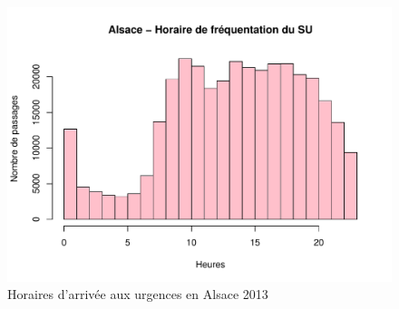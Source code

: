 \documentclass[12pt,english,french,twoside]{book}\usepackage[]{graphicx}\usepackage[]{color}
\makeatletter
\def\maxwidth{ %
  \ifdim\Gin@nat@width>\linewidth
    \linewidth
  \else
    \Gin@nat@width
  \fi
}
\newenvironment{knitrout}{}{} %
\makeatother
\begin{document}
\begin{figure}
\begin{center}
\begin{knitrout}
\color{fgcolor}
\includegraphics[width=\maxwidth]{figure/test23} 

\end{knitrout}

\end{center}
\caption{Horaires d'arrivée aux urgences en Alsace 2013}
\label{passage:als}
\end{figure}
\end{document}
